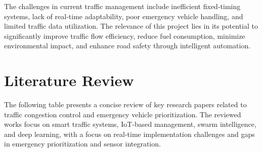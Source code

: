 \documentclass[12pt]{report}
\begin{document}
The challenges in current traffic management include inefficient fixed-timing systems, lack of real-time adaptability, poor emergency vehicle handling, and limited traffic data utilization. The relevance of this project lies in its potential to significantly improve traffic flow efficiency, reduce fuel consumption, minimize environmental impact, and enhance road safety through intelligent automation.

\section[Literature Review]{\textbf{Literature Review}}

The following table presents a concise review of key research papers related to traffic congestion control and emergency vehicle prioritization. The reviewed works focus on smart traffic systems, IoT-based management, swarm intelligence, and deep learning, with a focus on real-time implementation challenges and gaps in emergency prioritization and sensor integration.
\end{document}
